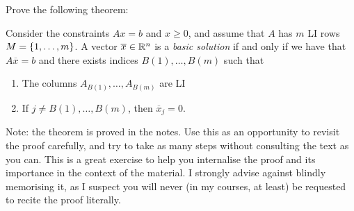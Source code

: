 
Prove the following theorem:

\begin{theorem*} 
	\small
	Consider the constraints $Ax = b$ and $x \geq 0$, and assume that $A$ has $m$ LI rows $M = \left\{ 1,\dots,m \right \}$. A vector $\overline{x} \in \mathbb{R}^n$ is a \emph{basic solution} if and only if we have that $A\overline{x} = b$ and there exists indices $B(1), \dots, B(m)$ such that
	\begin{enumerate}
		\item The columns $A_{B(1)}, \dots, A_{B(m)}$ are LI
		\item If $j \neq B(1), \dots, B(m)$, then $\overline{x}_j = 0$.
	\end{enumerate} 
\end{theorem*}

Note: the theorem is proved in the notes. Use this as an opportunity to revisit the proof carefully, and try to take as many steps without consulting the text as you can. This is a great exercise to help you internalise the proof and its importance in the context of the material. I strongly advise against blindly memorising it, as I suspect you will never (in my courses, at least) be requested to recite the proof literally.